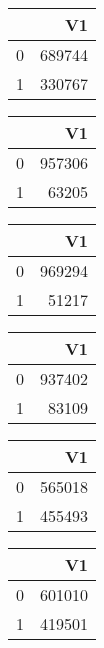 \bigskip\bigskip
\centering
\begin{tabular}{rr}
  \hline
 & V1 \\ 
  \hline
0 & 689744 \\ 
  1 & 330767 \\ 
   \hline
\end{tabular}

\bigskip\bigskip
\centering
\begin{tabular}{rr}
  \hline
 & V1 \\ 
  \hline
0 & 957306 \\ 
  1 & 63205 \\ 
   \hline
\end{tabular}

\bigskip\bigskip
\centering
\begin{tabular}{rr}
  \hline
 & V1 \\ 
  \hline
0 & 969294 \\ 
  1 & 51217 \\ 
   \hline
\end{tabular}

\bigskip\bigskip
\centering
\begin{tabular}{rr}
  \hline
 & V1 \\ 
  \hline
0 & 937402 \\ 
  1 & 83109 \\ 
   \hline
\end{tabular}

\bigskip\bigskip
\centering
\begin{tabular}{rr}
  \hline
 & V1 \\ 
  \hline
0 & 565018 \\ 
  1 & 455493 \\ 
   \hline
\end{tabular}

\bigskip\bigskip
\centering
\begin{tabular}{rr}
  \hline
 & V1 \\ 
  \hline
0 & 601010 \\ 
  1 & 419501 \\ 
   \hline
\end{tabular}

